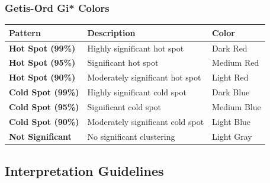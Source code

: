\documentclass{article}
\begin{document}
\subsubsection{Getis-Ord Gi* Colors}
\begin{longtable}{p{4cm}p{8cm}p{2cm}}
\toprule
\textbf{Pattern} & \textbf{Description} & \textbf{Color} \\
\midrule
\textbf{Hot Spot (99\%)} & Highly significant hot spot & Dark Red \\
\textbf{Hot Spot (95\%)} & Significant hot spot & Medium Red \\
\textbf{Hot Spot (90\%)} & Moderately significant hot spot & Light Red \\
\textbf{Cold Spot (99\%)} & Highly significant cold spot & Dark Blue \\
\textbf{Cold Spot (95\%)} & Significant cold spot & Medium Blue \\
\textbf{Cold Spot (90\%)} & Moderately significant cold spot & Light Blue \\
\textbf{Not Significant} & No significant clustering & Light Gray \\
\bottomrule
\end{longtable}

\subsection{Interpretation Guidelines}
\end{document}
